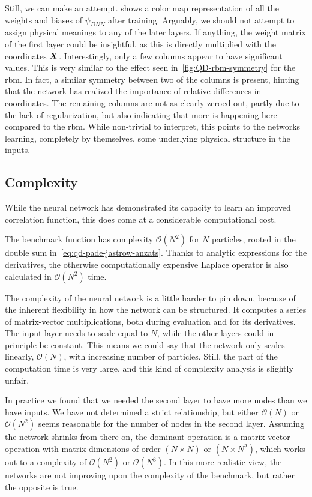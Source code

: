 \documentclass[Thesis.tex]{subfiles}
\begin{document}
Still, we can make an attempt.  shows a color map
representation of all the weights and biases of $\psi_{DNN}$ after training.
Arguably, we should not attempt to assign physical meanings to any of the later
layers. If anything, the weight matrix of the first layer could be insightful,
as this is directly multiplied with the coordinates $\bm{X}$. Interestingly,
only a few columns appear to have significant values. This is very similar to the
effect seen in~\cref{fig:QD-rbm-symmetry} for the \gls{rbm}. In fact, a similar
symmetry between two of the columns is present, hinting that the network
has realized the importance of relative differences in coordinates. The
remaining columns are not as clearly zeroed out, partly due to
the lack of regularization, but also indicating that more is happening here
compared to the \gls{rbm}. While non-trivial to interpret, this points to the
networks learning, completely by themselves, some underlying physical structure
in the inputs.



\subsection{Complexity}

While the neural network has demonstrated its capacity to learn an improved
correlation function, this does come at a considerable computational cost.

The benchmark function has complexity $\mathcal{O}(N^2)$ for $N$ particles,
rooted in the double sum in~\cref{eq:qd-pade-jastrow-anzats}. Thanks to
analytic expressions for the derivatives, the otherwise computationally expensive Laplace operator
is also calculated in $\mathcal{O}(N^2)$ time.

The complexity of the neural network is a little harder to pin down, because of
the inherent flexibility in how the network can be structured.
It computes a series of matrix-vector multiplications, both during
evaluation and for its derivatives. The input layer needs to scale equal to $N$,
while the other layers could in principle be constant. This means we could say
that the network only scales linearly, $\mathcal{O}(N)$, with increasing number
of particles. Still, the  part of the computation time is very
large, and this kind of complexity analysis is slightly unfair.

In practice we found that we needed the second layer to have more nodes than we
have inputs. We have not determined a strict relationship, but either
$\mathcal{O}(N)$ or $\mathcal{O}(N^2)$ seems reasonable for the number of nodes
in the second layer. Assuming the network shrinks from there on, the dominant
operation is a matrix-vector operation with matrix dimensions of order $(N\times
N)$ or $(N\times N^2)$, which works out to a complexity of $\mathcal{O}(N^2)$ or
$\mathcal{O}(N^3)$. In this more realistic view, the networks are not improving
upon the complexity of the benchmark, but rather the opposite is true.
\end{document}
